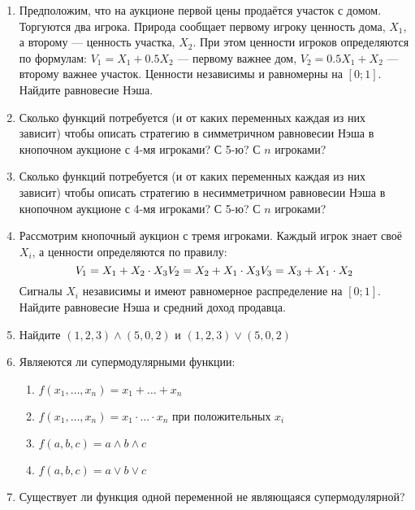 \begin{enumerate}
\begin{enumerate}
\end{enumerate}

\item Предположим, что на аукционе первой цены продаётся участок с домом. Торгуются два игрока. Природа сообщает первому игроку ценность дома, $ X_{1} $, а второму — ценность участка, $ X_{2} $. При этом ценности игроков определяются по формулам: $ V_{1}=X_{1}+0.5X_{2} $ — первому важнее дом, $ V_{2}=0.5X_{1}+X_{2} $ — второму важнее участок. Ценности независимы и равномерны на $ [0;1] $. Найдите равновесие Нэша.

\item Сколько функций потребуется (и от каких переменных каждая из них зависит) чтобы описать стратегию в симметричном равновесии Нэша в кнопочном аукционе с 4-мя игроками? С 5-ю? С $ n $ игроками?

\item Сколько функций потребуется (и от каких переменных каждая из них зависит) чтобы описать стратегию в несимметричном равновесии Нэша в кнопочном аукционе с 4-мя игроками? С 5-ю? С $ n $ игроками?

\item Рассмотрим кнопочный аукцион с тремя игроками. Каждый игрок знает своё $ X_{i} $, а ценности определяются по правилу:
\begin{equation}
V_{1}=X_{1}+X_{2}\cdot X_{3} \\
V_{2}=X_{2}+X_{1}\cdot X_{3} \\
V_{3}=X_{3}+X_{1}\cdot X_{2} \\
\end{equation}
Сигналы $ X_{i} $ независимы и имеют равномерное распределение на $ [0;1] $. Найдите равновесие Нэша и средний доход продавца.

\item Найдите $ (1,2,3)\wedge (5,0,2) $ и $ (1,2,3)\vee (5,0,2) $

\item Являеются ли супермодулярными функции:
\begin{enumerate}
\item $ f(x_{1},\ldots,x_{n})=x_{1}+\ldots+x_{n} $
\item $ f(x_{1},\ldots,x_{n})=x_{1}\cdot \ldots \cdot x_{n} $ при положительных $ x_{i} $
\item $ f(a,b,c)=a\wedge b\wedge c $
\item $ f(a,b,c)=a\vee b\vee c $
\end{enumerate}

\item Существует ли функция одной переменной не являющаяся супермодулярной?


\end{enumerate}
